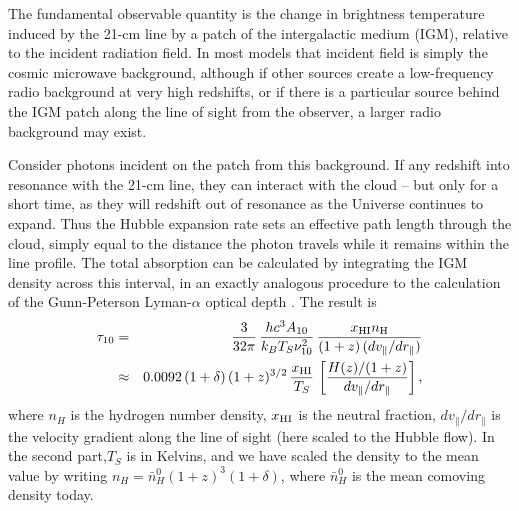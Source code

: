 \documentclass[a4paper,openany, 12pt]{book}
\begin{document}
The fundamental observable quantity is the change in brightness temperature induced by the 21-cm line by a patch of the intergalactic medium (IGM), relative to the incident radiation field. In most models that incident field is simply the cosmic microwave background, although if other sources create a low-frequency radio background at very high redshifts, or if there is a particular source behind the IGM patch along the line of sight from the observer, a larger radio background may exist.

Consider photons incident on the patch from this background. If any redshift into resonance with the 21-cm line, they can interact with the cloud -- but only for a short time, as they will redshift out of resonance as the Universe continues to expand. Thus the Hubble expansion rate sets an effective path length through the cloud, simply equal to the distance the photon travels while it remains within the line profile. The total absorption can be calculated by integrating the IGM density across this interval, in an exactly analogous procedure to the calculation of the Gunn-Peterson Lyman-$\alpha$ optical depth \cite{field59-obs, gunn65, scheuer65}. The result is
\begin{eqnarray}
\tau_{10} & = & \frac{3}{32 \pi} \, \frac{h c^3 A_{10}}{k_B T_S \nu_{10}^2} \, \frac{x_{\rm HI} n_{\rm H}}{(1+z) \, (d v_\parallel/d r_\parallel)}  \label{eq:optdepthcosmo} \\
 & \approx  & 0.0092 \, (1+\delta) \, (1+z)^{3/2}\, \frac{x_{\rm HI}}{T_S} \, \left[ \frac{H(z)/(1+z)}{d v_\parallel/d r_\parallel} \right],
\label{optdepthcosmo-approx}
\end{eqnarray}
where $n_H$ is the hydrogen number density, $x_{\rm HI}$ is the neutral fraction, $dv_\parallel/dr_\parallel$ is the velocity gradient along the line of sight (here scaled to the Hubble flow). In the second part,$T_S$ is in Kelvins, and we have scaled the density to the mean value by writing $n_H = \bar{n}_H^0 (1+z)^3 (1 + \delta)$, where $\bar{n}_H^0$ is the mean comoving density today.
\end{document}
